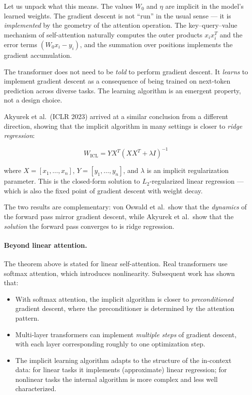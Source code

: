\documentclass[11pt, a4paper]{article}
\theoremstyle{definition}
\theoremstyle{plain}
\begin{document}
Let us unpack what this means.  The values $W_0$ and $\eta$ are implicit
in the model's learned weights.  The gradient descent is not ``run'' in
the usual sense --- it is \emph{implemented} by the geometry of the
attention operation.  The key--query--value mechanism of self-attention
naturally computes the outer products $x_i x_i^T$ and the error terms
$(W_0 x_i - y_i)$, and the summation over positions implements the
gradient accumulation.

\begin{keyinsight}
The transformer does not need to be \emph{told} to perform gradient
descent.  It \emph{learns} to implement gradient descent as a
consequence of being trained on next-token prediction across diverse
tasks.  The learning algorithm is an emergent property, not a design
choice.
\end{keyinsight}

Akyurek et al.\ (ICLR 2023) arrived at a similar conclusion from a
different direction, showing that the implicit algorithm in many settings
is closer to \emph{ridge regression}:

\begin{equation}
  W_{\text{ICL}} = Y X^T (X X^T + \lambda I)^{-1}
  \label{eq:ridge}
\end{equation}

where $X = [x_1, \ldots, x_n]$, $Y = [y_1, \ldots, y_n]$, and
$\lambda$ is an implicit regularization parameter.  This is the
closed-form solution to $L_2$-regularized linear regression ---
which is also the fixed point of gradient descent with weight decay.

The two results are complementary: von Oswald et al.\ show that the
\emph{dynamics} of the forward pass mirror gradient descent, while
Akyurek et al.\ show that the \emph{solution} the forward pass
converges to is ridge regression.

\paragraph{Beyond linear attention.}
The theorem above is stated for linear self-attention.  Real transformers
use softmax attention, which introduces nonlinearity.  Subsequent work
has shown that:
\begin{itemize}[leftmargin=2em]
  \item With softmax attention, the implicit algorithm is closer to
    \emph{preconditioned} gradient descent, where the preconditioner
    is determined by the attention pattern.
  \item Multi-layer transformers can implement \emph{multiple steps}
    of gradient descent, with each layer corresponding roughly to one
    optimization step.
  \item The implicit learning algorithm adapts to the structure of the
    in-context data: for linear tasks it implements (approximate) linear
    regression; for nonlinear tasks the internal algorithm is more
    complex and less well characterized.
\end{itemize}
\end{document}
